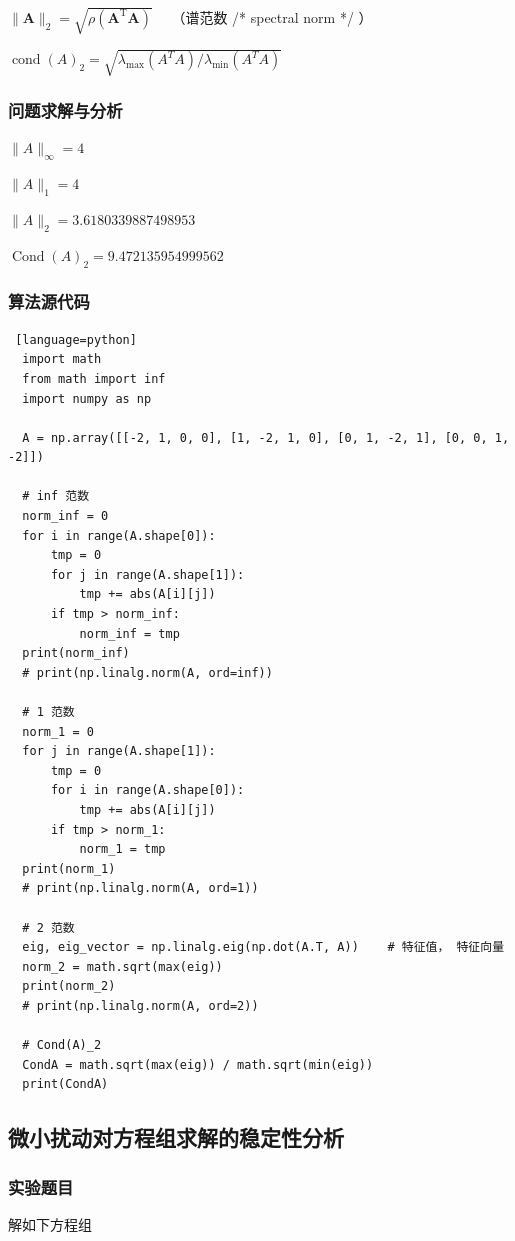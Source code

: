 \documentclass[UTF8]{ctexart}
\begin{document}
$\|\boldsymbol{A}\|_{2}=\sqrt{\rho\left(\boldsymbol{A}^{\mathrm{T}} \boldsymbol{A}\right)} \quad$ （谱范数 /* spectral norm */ ）

$\operatorname{cond}(A)_{2}=\sqrt{\lambda_{\max }\left(A^{T} A\right) / \lambda_{\min }\left(A^{T} A\right)}$

\subsubsection{问题求解与分析}
$\|{A}\|_{\infty} = 4 $

$\|A\|_{1} = 4$

$\|{A}\|_{2} = 3.6180339887498953$

$\operatorname{Cond}(A)_{2} = 9.472135954999562$
\subsubsection{算法源代码}
\begin{lstlisting} [language=python]
  import math
  from math import inf
  import numpy as np
  
  A = np.array([[-2, 1, 0, 0], [1, -2, 1, 0], [0, 1, -2, 1], [0, 0, 1, -2]])
  
  # inf 范数
  norm_inf = 0
  for i in range(A.shape[0]):
      tmp = 0
      for j in range(A.shape[1]):
          tmp += abs(A[i][j])
      if tmp > norm_inf:
          norm_inf = tmp
  print(norm_inf)
  # print(np.linalg.norm(A, ord=inf))
  
  # 1 范数
  norm_1 = 0
  for j in range(A.shape[1]):
      tmp = 0
      for i in range(A.shape[0]):
          tmp += abs(A[i][j])
      if tmp > norm_1:
          norm_1 = tmp
  print(norm_1)
  # print(np.linalg.norm(A, ord=1))
  
  # 2 范数
  eig, eig_vector = np.linalg.eig(np.dot(A.T, A))    # 特征值， 特征向量
  norm_2 = math.sqrt(max(eig))
  print(norm_2)
  # print(np.linalg.norm(A, ord=2))
  
  # Cond(A)_2
  CondA = math.sqrt(max(eig)) / math.sqrt(min(eig))
  print(CondA)
\end{lstlisting}

\subsection{微小扰动对方程组求解的稳定性分析}
\subsubsection{实验题目}
解如下方程组
\end{document}
